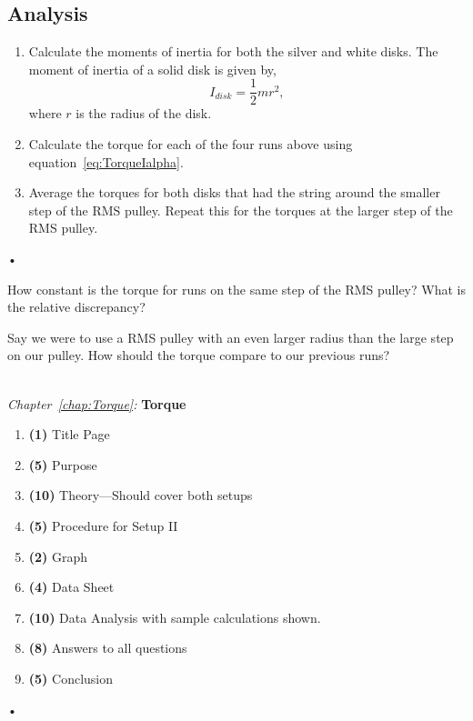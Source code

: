 \documentclass[main.tex]{subfiles}
\begin{document}
\subsection*{Analysis}
\begin{enumerate}
\item
Calculate the moments of inertia for both the silver and white disks. The moment of inertia of a solid disk is given by,
\[
I_{disk}=\frac{1}{2}mr^2,
\]
where $r$ is the radius of the disk.
\item
Calculate the torque for each of the four runs above using equation~\eqref{eq:TorqueIalpha}.
\item
Average the torques for both disks that had the string around the smaller step of the RMS pulley. Repeat this for the torques at the larger step of the RMS pulley.
\end{enumerate}•

\begin{question}
How constant is the torque for runs on the same step of the RMS pulley? What is the relative discrepancy?
\end{question}

\begin{question}
Say we were to use a RMS pulley with an even larger radius than the large step on our pulley. How should the torque compare to our previous runs?
\end{question}

\begin{samepage}
\hrulefill \\
\emph{Chapter~\ref{chap:Torque}:} \textbf{Torque}
\begin{enumerate}
\item
\textbf{(1)} Title Page
\item
\textbf{(5)} Purpose
\item
\textbf{(10)} Theory---Should cover both setups
\item
\textbf{(5)} Procedure for Setup II
\item
\textbf{(2)} Graph
\item
\textbf{(4)} Data Sheet
\item
\textbf{(10)} Data Analysis with sample calculations shown.
\item
\textbf{(8)} Answers to all questions
\item
\textbf{(5)} Conclusion
\end{enumerate}•
\end{samepage}
\end{document}
